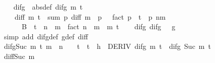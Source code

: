 \begin{isabellebody}
\isanewline
\ \ \isamarkupfalse%
\ difg\ \ {\isacharbrackleft}{\kern0pt}abs{\isacharunderscore}{\kern0pt}def{\isacharbrackright}{\kern0pt}{\isacharcolon}{\kern0pt}\ {\isachardoublequoteopen}difg\ m\ t\ {\isacharequal}{\kern0pt}\isanewline
\ \ \ \ diff\ m\ t\ {\isacharminus}{\kern0pt}\ {\isacharparenleft}{\kern0pt}sum\ {\isacharparenleft}{\kern0pt}{\isasymlambda}p{\isachardot}{\kern0pt}\ {\isacharparenleft}{\kern0pt}diff\ {\isacharparenleft}{\kern0pt}m\ {\isacharplus}{\kern0pt}\ p{\isacharparenright}{\kern0pt}\ {}\ {\isacharslash}{\kern0pt}\ fact\ p{\isacharparenright}{\kern0pt}\ {\isacharasterisk}{\kern0pt}\ {\isacharparenleft}{\kern0pt}t\ {\isacharcircum}{\kern0pt}\ p{\isacharparenright}{\kern0pt}{\isacharparenright}{\kern0pt}\ {\isacharbraceleft}{\kern0pt}{\isachardot}{\kern0pt}{\isachardot}{\kern0pt}{\isacharless}{\kern0pt}n{\isacharminus}{\kern0pt}m{\isacharbraceright}{\kern0pt}\ {\isacharplus}{\kern0pt}\isanewline
\ \ \ \ \ \ B\ {\isacharasterisk}{\kern0pt}\ {\isacharparenleft}{\kern0pt}{\isacharparenleft}{\kern0pt}t\ {\isacharcircum}{\kern0pt}\ {\isacharparenleft}{\kern0pt}n\ {\isacharminus}{\kern0pt}\ m{\isacharparenright}{\kern0pt}{\isacharparenright}{\kern0pt}\ {\isacharslash}{\kern0pt}\ fact\ {\isacharparenleft}{\kern0pt}n\ {\isacharminus}{\kern0pt}\ m{\isacharparenright}{\kern0pt}{\isacharparenright}{\kern0pt}{\isacharparenright}{\kern0pt}{\isachardoublequoteclose}\ \ m\ t\isanewline
\ \ \isamarkupfalse%
\ difg{\isacharunderscore}{\kern0pt}{}{\isacharcolon}{\kern0pt}\ {\isachardoublequoteopen}difg\ {}\ {\isacharequal}{\kern0pt}\ g{\isachardoublequoteclose}\isanewline
\ \ \ \ \isamarkupfalse%
\ {\isacharparenleft}{\kern0pt}simp\ add{\isacharcolon}{\kern0pt}\ difg{\isacharunderscore}{\kern0pt}def\ g{\isacharunderscore}{\kern0pt}def\ diff{\isacharunderscore}{\kern0pt}{}{\isacharparenright}{\kern0pt}\isanewline
\ \ \isamarkupfalse%
\ difg{\isacharunderscore}{\kern0pt}Suc{\isacharcolon}{\kern0pt}\ {\isachardoublequoteopen}{\isasymforall}m\ t{\isachardot}{\kern0pt}\ m\ {\isacharless}{\kern0pt}\ n\ {\isasymand}\ {}\ {\isasymle}\ t\ {\isasymand}\ t\ {\isasymle}\ h\ {\isasymlongrightarrow}\ DERIV\ {\isacharparenleft}{\kern0pt}difg\ m{\isacharparenright}{\kern0pt}\ t\ {\isacharcolon}{\kern0pt}{\isachargreater}{\kern0pt}\ difg\ {\isacharparenleft}{\kern0pt}Suc\ m{\isacharparenright}{\kern0pt}\ t{\isachardoublequoteclose}\isanewline
\ \ \ \ \isamarkupfalse%
\ diff{\isacharunderscore}{\kern0pt}Suc\ m\ \isamarkupfalse%

\end{isabellebody}
